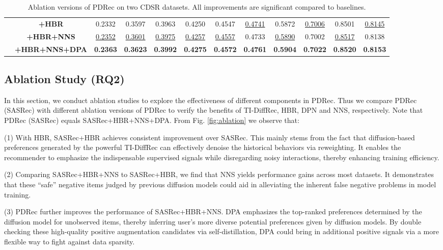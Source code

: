 \documentclass[letterpaper]{article} %
\begin{document}
\begin{table}[!t]
\begin{tabular}{|c|c|c|c|c|c|c|c|c|c|c|c|}
    & \textbf{+HBR}        & 0.2332 & 0.3597 & 0.3963 & 0.4250 & 0.4547 & \underline{0.4741} & 0.5872 & \underline{0.7006} & 0.8501 & \underline{0.8145} \\ 
    & \textbf{+HBR+NNS}     & \underline{0.2352} & \underline{0.3601} & \underline{0.3975} & \underline{0.4257} & \underline{0.4557} & 0.4733 & \underline{0.5890}  & 0.7002 & \underline{0.8517} & 0.8138 \\ 
    & \textbf{+HBR+NNS+DPA}  & \textbf{0.2363} & \textbf{0.3623} & \textbf{0.3992} & \textbf{0.4275} & \textbf{0.4572} & \textbf{0.4761} & \textbf{0.5904} & \textbf{0.7022} & \textbf{0.8520} & \textbf{0.8153} \\ \hline
\end{tabular}
\caption{Ablation versions of PDRec on two CDSR datasets. All improvements are significant compared to baselines.}
\label{tab:Ablation_CDSR}
\end{table}


\subsection{Ablation Study (RQ2)}
\label{sec.ablation}
In this section, we conduct ablation studies to explore the effectiveness of different components in PDRec.
Thus we compare PDRec (SASRec) with different ablation versions of PDRec to verify the benefits of TI-DiffRec, HBR, DPN and NNS, respectively. Note that PDRec (SASRec) equals SASRec+HBR+NNS+DPA. From Fig. \ref{fig:ablation} we observe that:

(1) With HBR, SASRec+HBR achieves consistent improvement over SASRec. This mainly stems from the fact that diffusion-based preferences generated by the powerful TI-DiffRec can effectively denoise the historical behaviors via reweighting. It enables the recommender to emphasize the indispensable supervised signals while disregarding noisy interactions, thereby enhancing training efficiency.

(2) Comparing SASRec+HBR+NNS to SASRec+HBR, we find that NNS yields performance gains across most datasets. It demonstrates that these ``safe'' negative items judged by previous diffusion models could aid in alleviating the inherent false negative problems in model training.

(3) PDRec further improves the performance of SASRec+HBR+NNS. DPA emphasizes the top-ranked preferences determined by the diffusion model for unobserved items, thereby inferring user's more diverse potential preferences given by diffusion models. By double checking these high-quality positive augmentation candidates via self-distillation, DPA could bring in additional positive signals via a more flexible way to fight against data sparsity.
\end{document}
